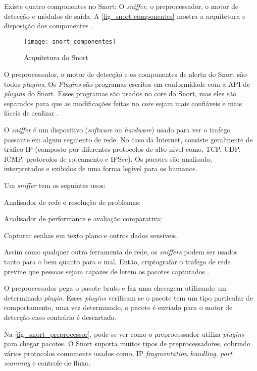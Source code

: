 Existe quatro componentes no Snort: O \textit{sniffer}, o preprocessador, o motor de detecção e módulos de saída. A \autoref{fig_snort-componentes} mostra a arquitetura e disposição dos componentes \cite{snort:andrew}.

\begin{figure}[!htb]
  \centering
  \caption{Arquitetura do Snort} \label{fig_snort-componentes}
  \texttt{[image: snort\_componentes]}
\end{figure}

O preprocessador, o motor de detecção e os componentes de alerta do Snort são todos \textit{plugins}. Os \textit{Plugins} são programas escritos em conformidade com a API de \textit{plugins} do Snort. Esses programas são usados no core do Snort, mas eles são separados para que as modificações feitas no \textit{core} sejam mais confiáveis e mais fáceis de realizar \cite{snort:andrew}.

O \textit{sniffer} é um dispositivo (\textit{software} ou \textit{hardware}) usado para ver o trafego passante em algum segmento de rede. No caso da Internet, consiste geralmente de trafico IP (composto por diferentes protocolos de alto nível como, TCP, UDP, ICMP, protocolos de roteamento e IPSec). Os pacotes são analisado, interpretados e exibidos de uma forma legível para os humanos.

Um \textit{sniffer} tem os seguintes usos:

\begin{alineas}
\item Analisador de rede e resolução de problemas;
\item Analisador de performance e avaliação comparativa;
\item Capturar senhas em texto plano e outros dados sensíveis.
\end{alineas}

Assim como qualquer outra ferramenta de rede, os \textit{sniffers} podem ser usados tanto para o bem quanto para o mal. Então, criptografar o trafego de rede previne que pessoas sejam capazes de lerem os pacotes capturados \cite{snort:andrew}.

O preprocessador pega o pacote bruto e faz uma checagem utilizando um determinado \textit{plugin}. Esses \textit{plugins} verificam se o pacote tem um tipo particular de comportamento, uma vez determinado, o pacote é enviado para o motor de detecção caso contrário é descartado.

Na \autoref{fig_snort_preprocessor}, pode-se ver como o preprocessador utiliza \textit{plugins} para chegar pacotes. O Snort suporta muitos tipos de preprocessadores, cobrindo vários protocolos comumente usados como, IP \textit{fragmentation handling}, \textit{port scanning} e controle de fluxo.

